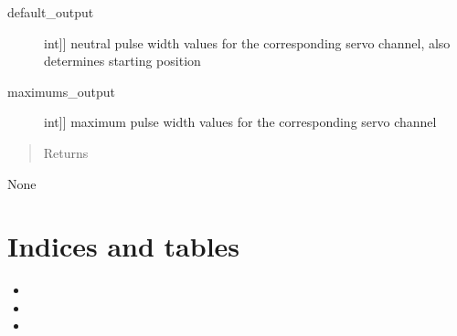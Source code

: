 \documentclass[letterpaper,10pt,english]{sphinxmanual}
\begin{document}
\begin{fulllineitems}
\begin{fulllineitems}
\begin{description}
\item[{default\_output}] \leavevmode{[}{[}int{]}{]}
\sphinxAtStartPar
neutral pulse width values for the corresponding servo channel, also determines starting position

\item[{maximums\_output}] \leavevmode{[}{[}int{]}{]}
\sphinxAtStartPar
maximum pulse width values for the corresponding servo channel

\end{description}
\begin{quote}\begin{description}
\item[{Returns}] \leavevmode
\end{description}\end{quote}

\sphinxAtStartPar
None

\end{fulllineitems}


\end{fulllineitems}



\chapter{Indices and tables}
\label{\detokenize{index:indices-and-tables}}\begin{itemize}
\item {} 
\sphinxAtStartPar
{}

\item {} 
\sphinxAtStartPar
{}

\item {} 
\sphinxAtStartPar
{}

\end{itemize}
\end{document}
